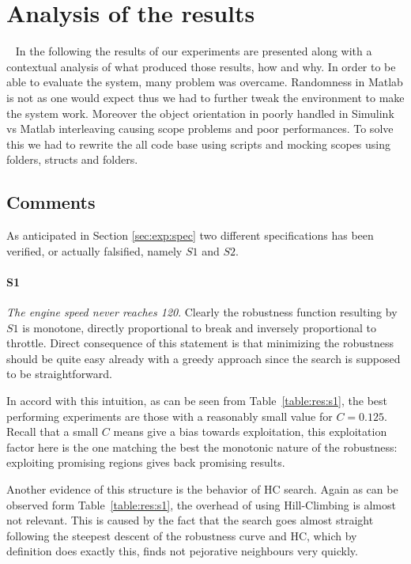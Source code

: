 \documentclass[11pt]{article}
\begin{document}
\pagebreak

\section{Analysis of the results}~\label{sec:resan}
In the following the results of our experiments are presented along with a contextual analysis of what produced those results, how and why.
In order to be able to evaluate the system, many problem was overcame. 
Randomness in Matlab is not as one would expect thus we had to further tweak the environment to make the system work. Moreover the object orientation in poorly handled in Simulink vs Matlab interleaving causing scope problems and poor performances. To solve this we had to rewrite the all code base using scripts and mocking scopes using folders, structs and folders. 

\subsection{Comments}
As anticipated in Section \ref{sec:exp:spec} two different specifications has been verified, or actually falsified, namely $S1$ and $S2$.

\paragraph{S1} \textit{The engine speed never reaches 120}. Clearly the robustness function resulting by $S1$ is monotone, directly proportional to break and inversely proportional to throttle.
Direct consequence of this statement is that minimizing the robustness should be quite easy already with a greedy approach since the search is supposed to be straightforward.

In accord with this intuition, as can be seen from Table~\ref{table:res:s1}, the best performing experiments are those with a reasonably small value for $C=0.125$. 
Recall that a small $C$ means give a bias towards exploitation, this exploitation factor here is the one matching the best the monotonic nature of the robustness: exploiting promising regions gives back promising results.

Another evidence of this structure is the behavior of HC search. Again as can be observed form Table~\ref{table:res:s1}, the overhead of using Hill-Climbing is almost not relevant. This is caused by the fact that the search goes almost straight following the steepest descent of the robustness curve and HC, which by definition does exactly this, finds not pejorative neighbours very quickly. 
\end{document}
